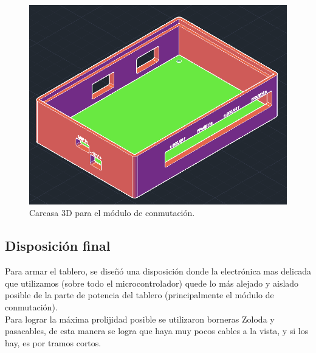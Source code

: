 \begin{figure}[H]
    \centering
    \includegraphics[width=0.75\linewidth]{hardware/Screenshot_20.png}
    \caption{Carcasa 3D para el módulo de conmutación.}
    \label{fig:conmutacion-3d}
\end{figure}

\subsection{Disposición final}

Para armar el tablero, se diseñó una disposición donde la electrónica mas delicada que utilizamos (sobre todo el microcontrolador) quede lo más alejado y aislado posible de la parte de potencia del tablero (principalmente el módulo de conmutación).\\ 

Para lograr la máxima prolijidad posible se utilizaron borneras Zoloda y pasacables, de esta manera se logra que haya muy pocos cables a la vista, y si los hay, es por tramos cortos.\\

